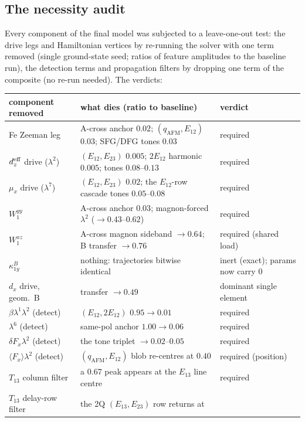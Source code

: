 \documentclass[11pt,a4paper]{article}
\newcommand{\qafm}{q_{\mathrm{AFM}}}
\begin{document}
\subsection{The necessity audit}
\label{sec:audit}

Every component of the final model was subjected to a leave-one-out
test: the drive legs and Hamiltonian vertices by re-running the solver
with one term removed (single ground-state seed; ratios of feature
amplitudes to the baseline run), the detection terms and propagation
filters by dropping one term of the composite (no re-run needed).
The verdicts:

\begin{center}\small
\renewcommand{\arraystretch}{1.2}
\begin{tabular}{lll}
\toprule
component removed & what dies (ratio to baseline) & verdict\\
\midrule
Fe Zeeman leg & A-cross anchor $0.02$; $(\qafm,E_{12})$ $0.03$;
  SFG/DFG tones $0.03$ & required\\
$d_z^{\rm eff}$ drive ($\lambda^2$) & $(E_{12},E_{23})$ $0.005$;
  $2E_{12}$ harmonic $0.005$; tones $0.08$--$0.13$ & required\\
$\mu_x$ drive ($\lambda^7$) & $(E_{12},E_{23})$ $0.02$; the
  $E_{12}$-row cascade tones $0.05$--$0.08$ & required\\
$W^{yy}_1$ & A-cross anchor $0.03$; magnon-forced $\lambda^2$
  ($\to0.43$--$0.62$) & required\\
$W^{xz}_1$ & A-cross magnon sideband $\to0.64$; B transfer
  $\to0.76$ & required (shared load)\\
$\kappa^B_{1y}$ & nothing: trajectories bitwise identical & inert
  (exact); params now carry $0$\\
$d_x$ drive, geom.\ B & transfer $\to0.49$ & dominant single
  element\\
$\beta\lambda^1\lambda^2$ (detect) & $(E_{12},2E_{12})$
  $0.95\to0.01$ & required\\
$\lambda^6$ (detect) & same-pol anchor $1.00\to0.06$ & required\\
$\delta F_x\lambda^2$ (detect) & the tone triplet $\to0.02$--$0.05$
  & required\\
$\langle F_x\rangle\lambda^2$ (detect) & $(\qafm,E_{12})$ blob
  re-centres at $0.40$ & required (position)\\
$T_{13}$ column filter & a $0.67$ peak appears at the $E_{13}$
  line centre & required\\
$T_{13}$ delay-row filter & the 2Q $(E_{13},E_{23})$ row returns at

\end{tabular}
\end{center}
\end{document}
